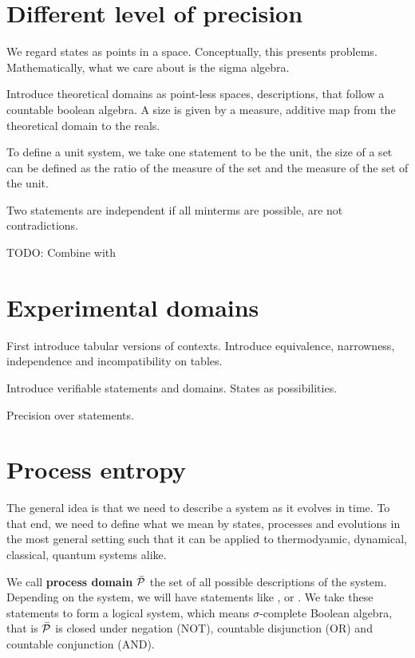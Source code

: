 \documentclass[letterpaper]{article}
\begin{document}
\section{Different level of precision}



We regard states as points in a space. Conceptually, this presents problems. Mathematically, what we care about is the sigma algebra.

Introduce theoretical domains as point-less spaces, descriptions, that follow a countable boolean algebra. A size is given by a measure, additive map from the theoretical domain to the reals.

To define a unit system, we take one statement to be the unit, the size of a set can be defined as the ratio of the measure of the set and the measure of the set of the unit.

Two statements are independent if all minterms are possible, are not contradictions.

TODO: Combine with

\section{Experimental domains}

First introduce tabular versions of contexts. Introduce equivalence, narrowness, independence and incompatibility on tables.

Introduce verifiable statements and domains. States as possibilities.

Precision over statements.


\section{Process entropy}

The general idea is that we need to describe a system as it evolves in time. To that end, we need to define what we mean by states, processes and evolutions in the most general setting such that it can be applied to thermodyamic, dynamical, classical, quantum systems alike.

We call \textbf{process domain} $\tdomain[P]$ the set of all possible descriptions of the system. Depending on the system, we will have statements like ,  or . We take these statements to form a logical system, which means $\sigma$-complete Boolean algebra, that is $\tdomain[P]$ is closed under negation (NOT), countable disjunction (OR) and countable conjunction (AND).
\end{document}
